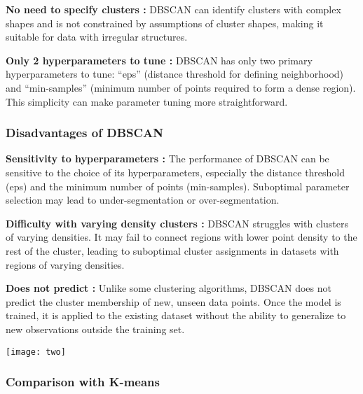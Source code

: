 \par \textbf{No need to specify clusters : }DBSCAN can identify clusters with complex shapes and is not constrained by assumptions of cluster shapes, making it suitable for data with irregular structures.

\par \textbf{Only 2 hyperparameters to tune : } DBSCAN has only two primary hyperparameters to tune: “eps” (distance threshold for defining neighborhood) and “min-samples” (minimum number of points required to form a dense region). This simplicity can make parameter tuning more straightforward.

\subsubsection{Disadvantages of DBSCAN}


\textbf{Sensitivity to hyperparameters : } The performance of DBSCAN can be sensitive to the choice of its hyperparameters, especially the distance threshold (eps) and the minimum number of points (min-samples). Suboptimal parameter selection may lead to under-segmentation or over-segmentation.

\textbf{Difficulty with varying density clusters : }DBSCAN struggles with clusters of varying densities. It may fail to connect regions with lower point density to the rest of the cluster, leading to suboptimal cluster assignments in datasets with regions of varying densities.

\textbf{Does not predict : } Unlike some clustering algorithms, DBSCAN does not predict the cluster membership of new, unseen data points. Once the model is trained, it is applied to the existing dataset without the ability to generalize to new observations outside the training set.

\begin{center}
	\texttt{[image: two]}  %
\end{center}
\subsubsection{Comparison with K-means}